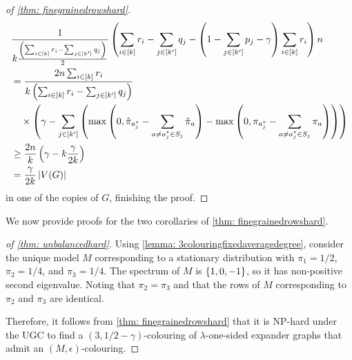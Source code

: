 \begin{proof}[of \cref{thm: finegrainedrowshard}]
    \begin{align*}
        &\frac1{k\frac{\left(\sum_{i\in[k]} r_i-\sum_{j\in[k']} q_j\right)}{2}}\left(\sum_{i\in[k]} r_i-\sum_{j\in[k']} q_j-\left(1-\sum_{j\in[k']} p_j-\gamma\right)\sum_{i\in[k]} r_i\right)n\\
        &= \frac{2n\sum_{i\in[k]} r_i}{k\left(\sum_{i\in[k]} r_i-\sum_{j\in[k']} q_j\right)}\\
        &\quad\times\left(\gamma-\sum_{j\in[k']} \left(\max\left(0, \hat{\pi}_{a_j^*} - \sum_{\substack{a \neq a_j^{*} \in S_j}} \hat{\pi}_a\right)-\max\left(0, \pi_{a_j^{*}} - \sum_{\substack{a \neq a_j^{*} \in S_j}} \pi_a\right)\right)\right)\\
        &\geq  \frac{2n}{k}\left(\gamma-k\frac{\gamma}{2k}\right)\\
        &=\frac{\gamma}{2k} \left\lvert V(G)\right\rvert
    \end{align*}
    in one of the copies of $G$, finishing the proof.
\end{proof}

We now provide proofs for the two corollaries of \cref{thm: finegrainedrowshard}.

\begin{proof}[of \cref{thm: unbalancedhard}]
    Using \cref{lemma: 3colouringfixedaveragedegree}, consider the unique model $M$ corresponding to a stationary distribution with $\pi_1 = 1/2$, $\pi_2 = 1/4$, and $\pi_3=1/4$. The spectrum of $M$ is $\left\{1, 0, -1\right\}$, so it has non-positive second eigenvalue. Noting that $\pi_2=\pi_3$ and that the rows of $M$ corresponding to $\pi_2$ and $\pi_3$ are identical.

    Therefore, it follows from \cref{thm: finegrainedrowshard} that it is NP-hard under the UGC to find a $(3, 1/2-\gamma)$-colouring of $\lambda$-one-sided expander graphs that admit an $(M, \epsilon)$-colouring.
\end{proof}

